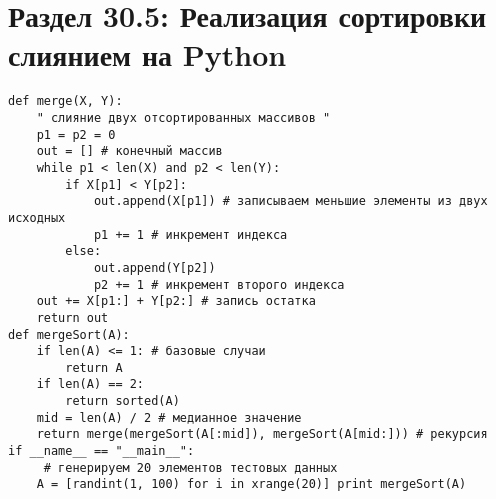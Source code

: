 \section*{Раздел 30.5: Реализация сортировки слиянием на Python}
\begin{tcolorbox}
\begin{verbatim}
def merge(X, Y):
	" слияние двух отсортированных массивов "
	p1 = p2 = 0
	out = [] # конечный массив
	while p1 < len(X) and p2 < len(Y):
		if X[p1] < Y[p2]:
			out.append(X[p1]) # записываем меньшие элементы из двух исходных
			p1 += 1 # инкремент индекса
		else:
			out.append(Y[p2])
			p2 += 1 # инкремент второго индекса
	out += X[p1:] + Y[p2:] # запись остатка
	return out
def mergeSort(A):
	if len(A) <= 1: # базовые случаи
		return A
	if len(A) == 2:
		return sorted(A)
	mid = len(A) / 2 # медианное значение
	return merge(mergeSort(A[:mid]), mergeSort(A[mid:])) # рекурсия
if __name__ == "__main__":
	 # генерируем 20 элементов тестовых данных
	A = [randint(1, 100) for i in xrange(20)] print mergeSort(A)
\end{verbatim}
\end{tcolorbox}
